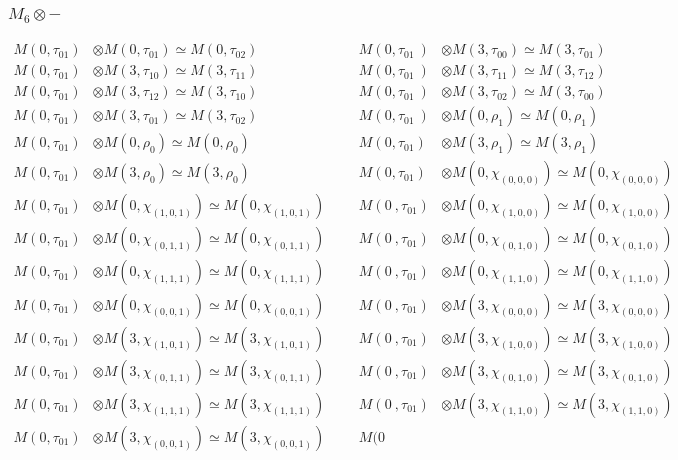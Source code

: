 \subsubsection{$M_6\otimes -$}
\begin{align*}
M(0,\tau_{01}) &\otimes M(0,\tau_{01}) \simeq M(0,\tau_{02}) &&& M(0,\tau_{01}\
) &\otimes M(3,\tau_{00}) \simeq M(3,\tau_{01})\\
M(0,\tau_{01}) &\otimes M(3,\tau_{10}) \simeq M(3,\tau_{11}) &&& M(0,\tau_{01}\
) &\otimes M(3,\tau_{11}) \simeq M(3,\tau_{12})\\
M(0,\tau_{01}) &\otimes M(3,\tau_{12}) \simeq M(3,\tau_{10}) &&& M(0,\tau_{01}\
) &\otimes M(3,\tau_{02}) \simeq M(3,\tau_{00})\\
M(0,\tau_{01}) &\otimes M(3,\tau_{01}) \simeq M(3,\tau_{02}) &&& M(0,\tau_{01}\
) &\otimes M(0,\rho_{1}) \simeq M(0,\rho_{1})\\
M(0,\tau_{01}) &\otimes M(0,\rho_{0}) \simeq M(0,\rho_{0}) &&& M(0,\tau_{01}) \
&\otimes M(3,\rho_{1}) \simeq M(3,\rho_{1})\\
M(0,\tau_{01}) &\otimes M(3,\rho_{0}) \simeq M(3,\rho_{0}) &&& M(0,\tau_{01}) \
&\otimes M(0,\chi_{(0,0,0)}) \simeq M(0,\chi_{(0,0,0)})\\
M(0,\tau_{01}) &\otimes M(0,\chi_{(1,0,1)}) \simeq M(0,\chi_{(1,0,1)}) &&& M(0\
,\tau_{01}) &\otimes M(0,\chi_{(1,0,0)}) \simeq M(0,\chi_{(1,0,0)})\\
M(0,\tau_{01}) &\otimes M(0,\chi_{(0,1,1)}) \simeq M(0,\chi_{(0,1,1)}) &&& M(0\
,\tau_{01}) &\otimes M(0,\chi_{(0,1,0)}) \simeq M(0,\chi_{(0,1,0)})\\
M(0,\tau_{01}) &\otimes M(0,\chi_{(1,1,1)}) \simeq M(0,\chi_{(1,1,1)}) &&& M(0\
,\tau_{01}) &\otimes M(0,\chi_{(1,1,0)}) \simeq M(0,\chi_{(1,1,0)})\\
M(0,\tau_{01}) &\otimes M(0,\chi_{(0,0,1)}) \simeq M(0,\chi_{(0,0,1)}) &&& M(0\
,\tau_{01}) &\otimes M(3,\chi_{(0,0,0)}) \simeq M(3,\chi_{(0,0,0)})\\
M(0,\tau_{01}) &\otimes M(3,\chi_{(1,0,1)}) \simeq M(3,\chi_{(1,0,1)}) &&& M(0\
,\tau_{01}) &\otimes M(3,\chi_{(1,0,0)}) \simeq M(3,\chi_{(1,0,0)})\\
M(0,\tau_{01}) &\otimes M(3,\chi_{(0,1,1)}) \simeq M(3,\chi_{(0,1,1)}) &&& M(0\
,\tau_{01}) &\otimes M(3,\chi_{(0,1,0)}) \simeq M(3,\chi_{(0,1,0)})\\
M(0,\tau_{01}) &\otimes M(3,\chi_{(1,1,1)}) \simeq M(3,\chi_{(1,1,1)}) &&& M(0\
,\tau_{01}) &\otimes M(3,\chi_{(1,1,0)}) \simeq M(3,\chi_{(1,1,0)})\\
M(0,\tau_{01}) &\otimes M(3,\chi_{(0,0,1)}) \simeq M(3,\chi_{(0,0,1)}) &&& M(0\

\end{align*}
